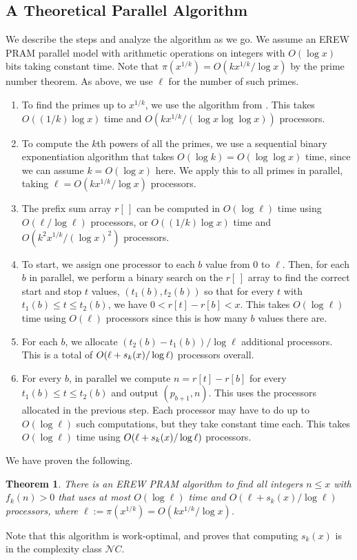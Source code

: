 \documentclass[11pt]{amsart}
\newcommand{\sk}{s_k}
\newtheorem{thm}{Theorem}[section]
\numberwithin{equation}{section}
\numberwithin{algorithm}{section}
\begin{document}
\subsection{A Theoretical Parallel Algorithm}

We describe the steps and analyze the algorithm as we go.
We assume an EREW PRAM parallel model with arithmetic operations
on integers with $O(\log x)$ bits taking constant time.
Note that $\pi(x^{1/k})=O(kx^{1/k}/\log x)$ by the prime number theorem.
As above, we use $\ell$ for the number of such primes.
\begin{enumerate}
    \item 
    To find the primes up to $x^{1/k}$, we use the algorithm from \cite{SP94}.
    This takes $O((1/k)\log x)$ time and 
    $O(kx^{1/k}/(\log x \log\log x))$
    processors.
    \item
    To compute the $k$th powers of all the primes,
    we use a sequential binary exponentiation algorithm that takes
    $O(\log k)=O(\log\log x)$ time,
    since we can assume $k=O(\log x)$ here.
    We apply this to all primes in parallel, 
    taking $\ell=O(kx^{1/k}/\log x)$ processors.
    \item 
    The prefix sum array $r[\,]$ can be computed 
    in $O(\log \ell)$ time using $O(\ell/\log \ell)$ processors, or $O((1/k)\log x)$ time and $O(k^2x^{1/k}/(\log x)^2)$ processors.
    \item 
    To start, we assign one processor to each $b$ value
    from $0$ to $\ell$.
    Then, for each $b$ in parallel, we perform a binary search
    on the $r[\,]$ array to find the correct start and stop
    $t$ values, $(t_1(b), t_2(b))$ so that for every $t$ 
    with $t_1(b)\le t\le t_2(b)$, we have
    $0<r[t]-r[b]<x$.
    This takes $O(\log \ell)$ time using $O(\ell)$ processors
    since this is how many $b$ values there are.
    \item 
    For each $b$, we allocate $(t_2(b)-t_1(b))/\log \ell$ additional
    processors.
    This is a total of $O(\ell+{s_k}(x)/\log \ell)$ processors overall.
    \item 
    For every $b$, in parallel we compute $n=r[t]-r[b]$ for every
    $t_1(b)\le t \le t_2(b)$
    and output $(p_{b+1},n)$.
    This uses the processors allocated in the previous step.
    Each processor may have to do up to $O(\log \ell)$ such
    computations, but they take constant time each.
    This takes $O(\log \ell)$ time using
    $O( \ell + {s_k}(x)/\log \ell)$ processors. 

\end{enumerate}
We have proven the following.
\begin{thm}
    There is an EREW PRAM algorithm to find all integers $n\le x$
    with $f_k(n)>0$ that uses at most $O(\log\ell)$ time
    and $O(\ell+s_k(x)/\log\ell)$ processors,
    where $\ell:=\pi(x^{1/k})=O(kx^{1/k}/\log x)$.
\end{thm}
Note that this algorithm is work-optimal, and proves that
computing $\sk(x)$ is in the complexity class $\mathcal NC$.
\end{document}
